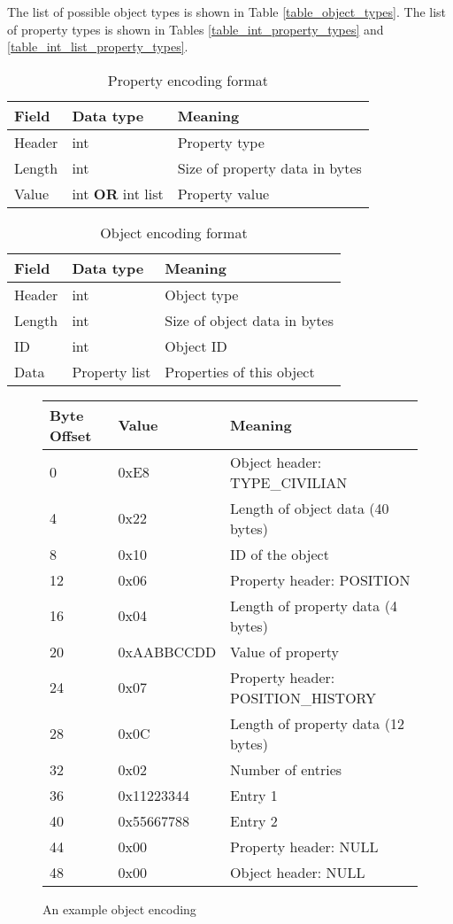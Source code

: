 The list of possible object types is shown in Table \ref{table_object_types}. The list of property types is shown in Tables \ref{table_int_property_types} and \ref{table_int_list_property_types}.

\begin{table}[p]
\center
\begin{tabular}{|l|l|l|}
\hline
Field & Data type & Meaning\\
\hline
Header & int & Property type\\
Length & int & Size of property data in bytes\\
Value & int \textbf{OR} int list & Property value\\
\hline
\end{tabular}
\caption{Property encoding format}
\label{table_property_format}
\end{table}

\begin{table}[p]
\center
\begin{tabular}{|l|l|l|}
\hline
Field & Data type & Meaning\\
\hline
Header & int & Object type\\
Length & int & Size of object data in bytes\\
ID & int & Object ID\\
Data & Property list & Properties of this object\\
\hline
\end{tabular}
\caption{Object encoding format}
\label{table_object_format}
\end{table}

\begin{figure}[p]
\center
\begin{tabular}{|l|l|l|}
\hline
Byte Offset & Value & Meaning\\
\hline
0 & 0xE8 & Object header: TYPE\_CIVILIAN\\
4 & 0x22 & Length of object data (40 bytes)\\
8 & 0x10 & ID of the object\\
12 & 0x06 & Property header: POSITION\\
16 & 0x04 & Length of property data (4 bytes)\\
20 & 0xAABBCCDD & Value of property\\
24 & 0x07 & Property header: POSITION\_HISTORY\\
28 & 0x0C & Length of property data (12 bytes)\\
32 & 0x02 & Number of entries\\
36 & 0x11223344 & Entry 1\\
40 & 0x55667788 & Entry 2\\
44 & 0x00 & Property header: NULL\\
48 & 0x00 & Object header: NULL\\
\hline
\end{tabular}
\caption{An example object encoding}
\label{figure_example_object}
\end{figure}

